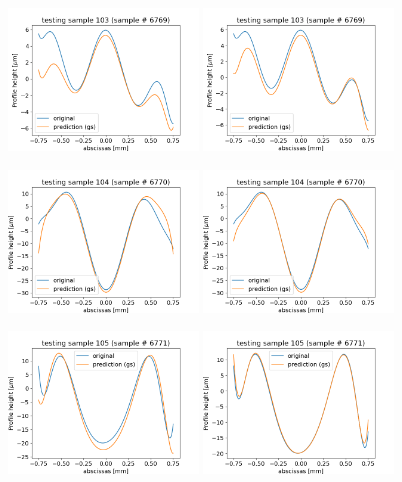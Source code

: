 \documentclass[]{article}
\begin{document}
\begin{figure}
\includegraphics[width=0.45\textwidth]{figures/v25p103.png}
\includegraphics[width=0.45\textwidth]{figures/v26p103.png}

\includegraphics[width=0.45\textwidth]{figures/v25p104.png}
\includegraphics[width=0.45\textwidth]{figures/v26p104.png}

\includegraphics[width=0.45\textwidth]{figures/v25p105.png}
\includegraphics[width=0.45\textwidth]{figures/v26p105.png}
\end{figure}
\end{document}
